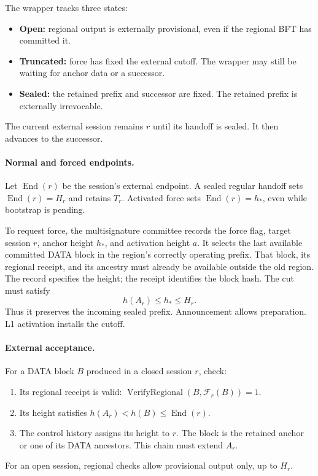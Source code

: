 \documentclass[11pt,a4paper]{article}
\newcommand{\FC}{\mathcal F}
\begin{document}
The wrapper tracks three states:
\begin{itemize}
\item \textbf{Open:} regional output is externally provisional, even if
the regional BFT has committed it.
\item \textbf{Truncated:} force has fixed the external cutoff.
The wrapper may still be waiting for anchor data or a successor.
\item \textbf{Sealed:} the retained prefix and successor are fixed.
The retained prefix is externally irrevocable.
\end{itemize}
The current external session remains $r$ until its handoff is sealed.
It then advances to the successor.

\paragraph{Normal and forced endpoints.}
Let $\operatorname{End}(r)$ be the session's external endpoint.
A sealed regular handoff sets $\operatorname{End}(r)=H_r$ and retains
$T_r$. Activated force sets $\operatorname{End}(r)=h_*$, even while
bootstrap is pending.

To request force, the multisignature committee records the force flag,
target session $r$, anchor height $h_*$, and activation height $a$.
It selects the last available committed DATA block in the region's
correctly operating prefix. That block, its regional receipt, and its
ancestry must already be available outside the old region.
The record specifies the height; the receipt identifies the block hash.
The cut must satisfy
\[
 h(A_r)\le h_*\le H_r.
\]
Thus it preserves the incoming sealed prefix.
Announcement allows preparation. L1 activation installs the cutoff.

\paragraph{External acceptance.}
For a DATA block $B$ produced in a closed session $r$, check:
\begin{enumerate}[label=(\roman*)]
\item Its regional receipt is valid:
$\operatorname{VerifyRegional}(B,\FC_r(B))=1$.
\item Its height satisfies $h(A_r)<h(B)\le\operatorname{End}(r)$.
\item The control history assigns its height to $r$.
The block is the retained anchor or one of its DATA ancestors.
This chain must extend $A_r$.
\end{enumerate}
For an open session, regional checks allow provisional output only,
up to $H_r$.
\end{document}
